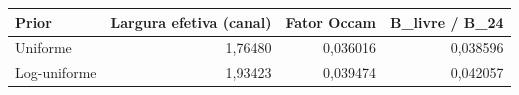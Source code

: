 \begin{tabular}{lrrr}
\toprule
Prior & Largura efetiva (canal) & Fator Occam & B\_livre / B\_24 \\
\midrule
Uniforme & 1,76480 & 0,036016 & 0,038596 \\
Log-uniforme & 1,93423 & 0,039474 & 0,042057 \\
\bottomrule
\end{tabular}
